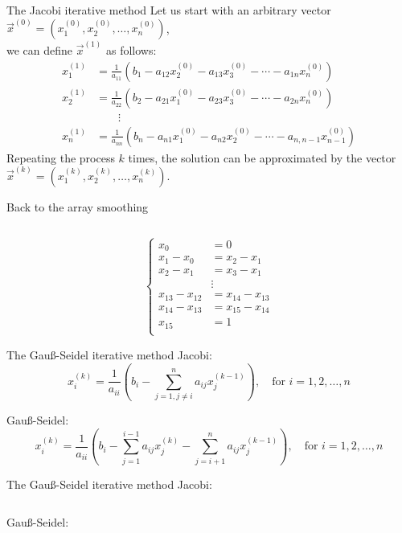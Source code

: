 \documentclass[UKenglish,aspectratio=169]{beamer}
\begin{document}
\begin{frame}{The Jacobi iterative method}
Let us start with an arbitrary vector $\vec{x}^{(0)}=\left(x_1^{(0)}, x_2^{(0)}, \dots, x_n^{(0)}\right)$,\\
\pause
we can define $\vec{x}^{(1)}$ as follows:
\begin{align*}
x_1^{(1)} &= \frac{1}{a_{11}}(b_1 - a_{12}x_2^{(0)} - a_{13}x_3^{(0)} - \cdots - a_{1n}x_n^{(0)})\\
x_2^{(1)} &= \frac{1}{a_{22}}(b_2 - a_{21}x_1^{(0)} - a_{23}x_3^{(0)} - \cdots - a_{2n}x_n^{(0)})\\
    & \qquad \vdots \\
x_n^{(1)} &= \frac{1}{a_{nn}}(b_n - a_{n1}x_1^{(0)} - a_{n2}x_2^{(0)} - \cdots - a_{n,n-1}x_{n-1}^{(0)})
\end{align*}
\pause
Repeating the process $k$ times, the solution can be approximated by the vector $\vec{x}^{(k)}=\left(x_1^{(k)}, x_2^{(k)}, \dots, x_n^{(k)}\right)$.
\end{frame}

\begin{frame}{Back to the array smoothing}
\inputminted[frame=single,linenos=true]{python}{listings/example_3.1.py}
$$
\left\{
\begin{array}{rl}
 x_0 &= 0 \\
x_1-x_0 &= x_2-x_1 \\
x_2-x_1 &= x_3-x_1 \\
     &  \vdots \\
x_{13}-x_{12}     &= x_{14}-x_{13} \\
x_{14}-x_{13}     &= x_{15}-x_{14} \\
x_{15} &= 1 \\
\end{array}
\right.
$$
\end{frame}

\begin{frame}{The Gauß-Seidel iterative method}
Jacobi:
$$
x_i^{(k)} = \frac{1}{a_{ii}} \left(b_i - \sum\limits_{j=1,j\neq i}^n a_{ij}x_j^{(k-1)} \right), \quad \text{for } i=1,2,\dots,n
$$
\pause

\vspace{47pt}
Gauß-Seidel:
$$
x_i^{(k)} = \frac{1}{a_{ii}} \left(b_i - \sum\limits_{j=1}^{i-1} a_{ij}x_j^{(k)} -  \sum\limits_{j=i+1}^n a_{ij}x_j^{(k-1)} \right), \quad \text{for } i=1,2,\dots,n
$$
\end{frame}

\begin{frame}{The Gauß-Seidel iterative method}
Jacobi:
\inputminted[frame=single,linenos=true]{python}{listings/example_3.1.py}

Gauß-Seidel:
\inputminted[frame=single,linenos=true]{python}{listings/example_3.2.py}
\end{frame}
\end{document}
